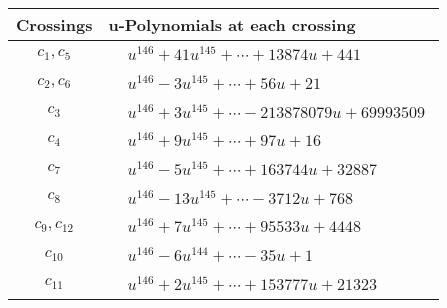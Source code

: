 \documentclass[1p]{elsarticle_modified}
\theoremstyle{definition}
\begin{document}
\begin{tabular}{m{50pt}|m{274pt}}
Crossings & \hspace{64pt}u-Polynomials at each crossing \\
\hline $$\begin{aligned}c_{1},c_{5}\end{aligned}$$&$\begin{aligned}
&u^{146}+41 u^{145}+\cdots+13874 u+441
\end{aligned}$\\
\hline $$\begin{aligned}c_{2},c_{6}\end{aligned}$$&$\begin{aligned}
&u^{146}-3 u^{145}+\cdots+56 u+21
\end{aligned}$\\
\hline $$\begin{aligned}c_{3}\end{aligned}$$&$\begin{aligned}
&u^{146}+3 u^{145}+\cdots-213878079 u+69993509
\end{aligned}$\\
\hline $$\begin{aligned}c_{4}\end{aligned}$$&$\begin{aligned}
&u^{146}+9 u^{145}+\cdots+97 u+16
\end{aligned}$\\
\hline $$\begin{aligned}c_{7}\end{aligned}$$&$\begin{aligned}
&u^{146}-5 u^{145}+\cdots+163744 u+32887
\end{aligned}$\\
\hline $$\begin{aligned}c_{8}\end{aligned}$$&$\begin{aligned}
&u^{146}-13 u^{145}+\cdots-3712 u+768
\end{aligned}$\\
\hline $$\begin{aligned}c_{9},c_{12}\end{aligned}$$&$\begin{aligned}
&u^{146}+7 u^{145}+\cdots+95533 u+4448
\end{aligned}$\\
\hline $$\begin{aligned}c_{10}\end{aligned}$$&$\begin{aligned}
&u^{146}-6 u^{144}+\cdots-35 u+1
\end{aligned}$\\
\hline $$\begin{aligned}c_{11}\end{aligned}$$&$\begin{aligned}
&u^{146}+2 u^{145}+\cdots+153777 u+21323
\end{aligned}$\\
\hline
\end{tabular}\\~\\
\end{document}
